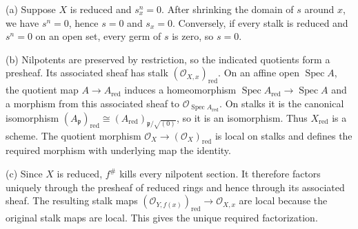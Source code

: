 (a) Suppose $X$ is reduced and $s_x^n=0$. After shrinking the domain of $s$ around $x$, we have $s^n=0$, hence $s=0$ and $s_x=0$. Conversely, if every stalk is reduced and $s^n=0$ on an open set, every germ of $s$ is zero, so $s=0$.

(b) Nilpotents are preserved by restriction, so the indicated quotients form a presheaf. Its associated sheaf has stalk $(\mathcal O_{X,x})_{\mathrm{red}}$. On an affine open $\operatorname{Spec}A$, the quotient map $A\to A_{\mathrm{red}}$ induces a homeomorphism $\operatorname{Spec}A_{\mathrm{red}}\to\operatorname{Spec}A$ and a morphism from this associated sheaf to $\mathcal O_{\operatorname{Spec}A_{\mathrm{red}}}$. On stalks it is the canonical isomorphism $(A_{\mathfrak p})_{\mathrm{red}}\cong(A_{\mathrm{red}})_{\mathfrak p/\sqrt{(0)}}$, so it is an isomorphism. Thus $X_{\mathrm{red}}$ is a scheme. The quotient morphism $\mathcal O_X\to(\mathcal O_X)_{\mathrm{red}}$ is local on stalks and defines the required morphism with underlying map the identity.

(c) Since $X$ is reduced, $f^\#$ kills every nilpotent section. It therefore factors uniquely through the presheaf of reduced rings and hence through its associated sheaf. The resulting stalk maps $(\mathcal O_{Y,f(x)})_{\mathrm{red}}\to\mathcal O_{X,x}$ are local because the original stalk maps are local. This gives the unique required factorization.
